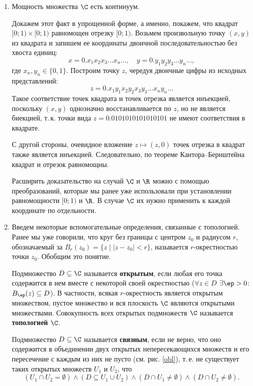 \begin{enumerate}
\item  Мощность множества $\C$ есть континуум.

Докажем этот факт в упрощенной форме, а именно, покажем, что квадрат $[0;1)\times[0;1)$ равномощен отрезку $[0;1)$. Возьмем произвольную точку $(x,y)$ из квадрата и запишем ее координаты двоичной последовательностью без хвоста единиц:
$$
x = 0.x_1x_2x_3\dots x_n\dots,\quad y=0.y_1y_2y_3\dots y_n\dots,
$$
где $x_n,y_n\in\{0,1\}$. Построим точку $z$, чередуя двоичные цифры из исходных представлений:
$$
z = 0.x_1y_1x_2y_2x_3y_3\dots x_ny_n\dots
$$
Такое соответствие точек квадрата и точек отрезка является инъекцией, поскольку $(x,y)$ однозначно восстанавливается по $z$, но не является биекцией, т.\,к. точки вида $z=0.0101010101010101$ не имеют соответствия в квадрате.

С другой стороны, очевидное вложение $z\mapsto (z,0)$ точек отрезка в квадрат также является инъекцией. Следовательно, по теореме Кантора--Бернштейна квадрат и отрезок равномощны.

Расширить доказательство на случай $\C$ и $\R$ можно с помощью преобразований, которые мы ранее уже использовали при установлении равномощности $[0;1)$ и $\R$. В случае $\C$ их нужно применить к каждой координате по отдельности.

\item Введем некоторые вспомогательные определения, связанные с топологией. Ранее мы уже говорили, что круг без границы с центром $z_0$ и радиусом $r$, обозначаемый за $B_r(z_0)=\{z\mid|z-z_0|<r\}$, называется $r$-окрестностью точки $z_0$. Обобщим это понятие.

Подмножество $D\subseteq\C$ называется \textbf{открытым}, если любая его точка содержится в нем вместе с некоторой своей окрестностью ($\forall z\in D$ $\exists\ep>0$: $B_\ep(z)\subseteq D$). В частности, всякая $r$-окрестность является открытым множеством, пустое множество и вся плоскость $\C$ являются открытыми множествами. Совокупность всех открытых подмножеств $\C$ называется \textbf{топологией} $\C$.

Подмножество $D\subseteq\C$ называется \textbf{связным}, если не верно, что оно содержится в объединении двух открытых непересекающихся множеств и его пересечение с каждым из них не пусто (см. рис. \ref{obl}), т.\,е. не существует таких открытых множеств $U_1$ и $U_2$, что
$$
(U_1\cap U_2=\emptyset)\land(D\subseteq U_1\cup U_2)\land(D\cap U_1\ne\emptyset)\land(D\cap U_2\ne\emptyset).
$$


\end{enumerate}
